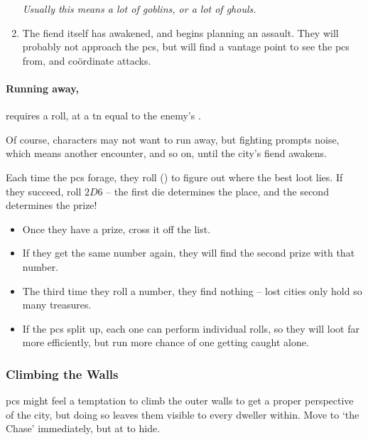 \begin{multicols}{2}
\begin{enumerate}
  \textit{Usually this means a lot of goblins, or a lot of ghouls.}
  \item
  The fiend itself has awakened, and begins planning an assault.
  They will probably not approach the \glspl{pc}, but will find a vantage point to see the \glspl{pc} from, and co\"ordinate attacks.
\end{enumerate}

\paragraph{Running away,}
requires a  roll, at a \gls{tn} equal to the enemy's .

Of course, characters may not want to run away, but fighting prompts noise, which means another encounter, and so on, until the city's fiend awakens.

\label{lostForaging}

Each time the \glspl{pc} forage, they roll  (\tn[12]) to figure out where the best loot lies.
If they succeed, roll $2D6$ -- the first die determines the place, and the second determines the prize!

\begin{itemize}
  \item
  Once they have a prize, cross it off the list.
  \item
  If they get the same number again, they will find the second prize with that number.
  \item
  The third time they roll a number, they find nothing -- lost cities only hold so many treasures.
  \item
  If the \glspl{pc} split up, each one can perform individual rolls, so they will loot far more efficiently, but run more chance of one getting caught alone.

\end{itemize}

\subsubsection{Climbing the Walls}

\Glspl{pc} might feel a temptation to climb the outer walls to get a proper perspective of the city, but doing so leaves them visible to every dweller within.
Move to `the Chase' immediately, but at \tn[12] to hide.

\end{multicols}

\foragingChart

